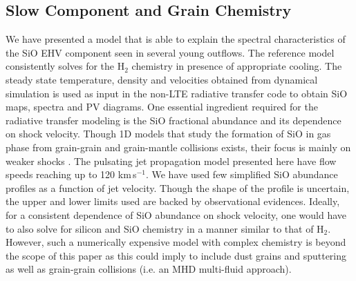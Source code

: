 \documentclass[useAMS,usenatbib]{mn2e}
\begin{document}
\subsection{Slow Component and Grain Chemistry}
%
We have presented a model that is able to explain the spectral characteristics
of the SiO EHV component seen
in several young outflows. The reference model
consistently solves for the H$_{2}$ chemistry in presence of
appropriate cooling. The steady state temperature, density and velocities obtained from dynamical
simulation is used as input in the non-LTE radiative transfer code to obtain SiO maps, spectra and PV
diagrams. One essential ingredient required for the radiative transfer modeling
is the SiO fractional abundance and its dependence on shock velocity. 
Though 1D models that study the formation of SiO in gas phase from grain-grain and grain-mantle
collisions exists, their focus is mainly on weaker shocks
\citep{Schilke:1997p14140, Caselli:1997p14853, Gusdorf:2008p13800, VanLoo:2013p16573}. 
The pulsating jet propagation model presented here have flow speeds
reaching up to 120 km\,s$^{-1}$. We have used few
simplified SiO abundance profiles as a function of jet
velocity. Though the shape of the profile is uncertain, the upper and
lower limits used are backed by observational evidences. Ideally, for a consistent
dependence of SiO abundance on shock velocity, one would have to also
solve for silicon and SiO chemistry in a manner similar to that of
H$_{2}$. However, such a numerically expensive model 
with complex chemistry is beyond the scope of this paper 
as this could imply to include dust grains and sputtering 
as well as grain-grain collisions (i.e. an MHD multi-fluid approach).  
%
\end{document}
